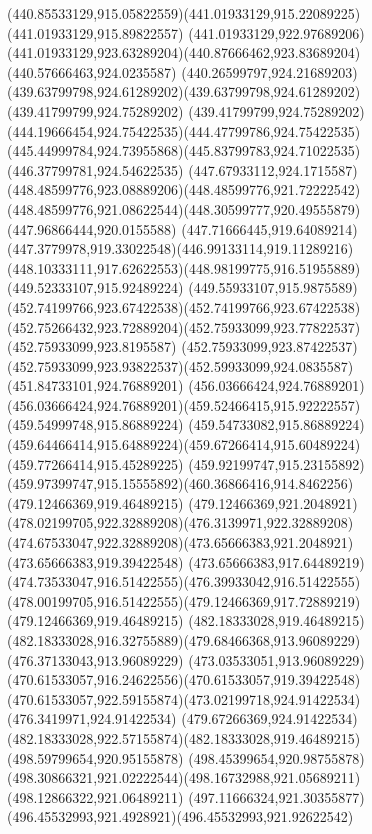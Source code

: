 {{		\curveto(440.85533129,915.05822559)(441.01933129,915.22089225)(441.01933129,915.89822557)
		\lineto(441.01933129,922.97689206)
		\curveto(441.01933129,923.63289204)(440.87666462,923.83689204)(440.57666463,924.0235587)
		\curveto(440.26599797,924.21689203)(439.63799798,924.61289202)(439.63799798,924.61289202)
		\lineto(439.41799799,924.75289202)
		\curveto(439.41799799,924.75289202)(444.19666454,924.75422535)(444.47799786,924.75422535)
		\curveto(445.44999784,924.73955868)(445.83799783,924.71022535)(446.37799781,924.54622535)
		\curveto(447.67933112,924.1715587)(448.48599776,923.08889206)(448.48599776,921.72222542)
		\curveto(448.48599776,921.08622544)(448.30599777,920.49555879)(447.96866444,920.0155588)
		\curveto(447.71666445,919.64089214)(447.3779978,919.33022548)(446.99133114,919.11289216)
		\curveto(448.10333111,917.62622553)(448.98199775,916.51955889)(449.52333107,915.92489224)
		\curveto(449.55933107,915.9875589)(452.74199766,923.67422538)(452.74199766,923.67422538)
		\curveto(452.75266432,923.72889204)(452.75933099,923.77822537)(452.75933099,923.8195587)
		\curveto(452.75933099,923.87422537)(452.75933099,923.93822537)(452.59933099,924.0835587)
		\lineto(451.84733101,924.76889201)
		\lineto(456.03666424,924.76889201)
		\curveto(456.03666424,924.76889201)(459.52466415,915.92222557)(459.54999748,915.86889224)
		\lineto(459.54733082,915.86889224)
		\curveto(459.64466414,915.64889224)(459.67266414,915.60489224)(459.77266414,915.45289225)
		\curveto(459.92199747,915.23155892)(459.97399747,915.15555892)(460.36866416,914.8462256)
		\moveto(479.12466369,919.46489215)
		\curveto(479.12466369,921.2048921)(478.02199705,922.32889208)(476.3139971,922.32889208)
		\curveto(474.67533047,922.32889208)(473.65666383,921.2048921)(473.65666383,919.39422548)
		\curveto(473.65666383,917.64489219)(474.73533047,916.51422555)(476.39933042,916.51422555)
		\curveto(478.00199705,916.51422555)(479.12466369,917.72889219)(479.12466369,919.46489215)
		\moveto(482.18333028,919.46489215)
		\curveto(482.18333028,916.32755889)(479.68466368,913.96089229)(476.37133043,913.96089229)
		\curveto(473.03533051,913.96089229)(470.61533057,916.24622556)(470.61533057,919.39422548)
		\curveto(470.61533057,922.59155874)(473.02199718,924.91422534)(476.3419971,924.91422534)
		\curveto(479.67266369,924.91422534)(482.18333028,922.57155874)(482.18333028,919.46489215)
		\moveto(498.59799654,920.95155878)
		\curveto(498.45399654,920.98755878)(498.30866321,921.02222544)(498.16732988,921.05689211)
		\lineto(498.12866322,921.06489211)
		\curveto(497.11666324,921.30355877)(496.45532993,921.4928921)(496.45532993,921.92622542)
}}
